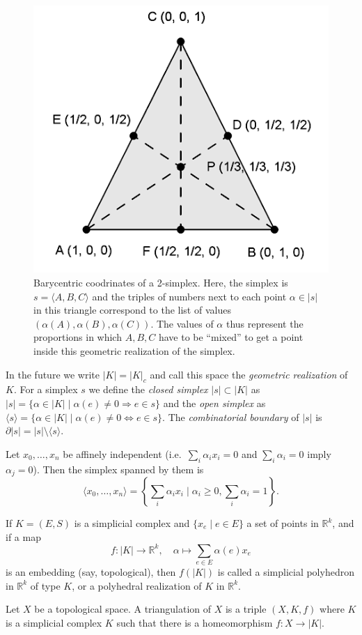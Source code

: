 \documentclass[english,letterpaper]{article}%
\numberwithin{equation}{section}
\numberwithin{figure}{section}
\numberwithin{table}{section}
\theoremstyle{definition}
\theoremstyle{definition}
\theoremstyle{definition}
\theoremstyle{plain}
\theoremstyle{plain}
\theoremstyle{plain}
\theoremstyle{plain}
\theoremstyle{remark}
\theoremstyle{remark}
\newcommand{\bbR}{\mathbb{R}}
\renewcommand{\geq}{\geqslant}
\begin{document}
\begin{figure}[h]
    \centering
    \includegraphics[scale=0.3]{Images/barycentric.png}
    \caption{Barycentric coodrinates of a 2-simplex. Here, the simplex is $s=\langle A,B,C\rangle$ and the triples of numbers next to each point $\alpha\in |s|$ in this triangle correspond to the list of values $(\alpha(A),\alpha(B),\alpha(C))$. The values of $\alpha$ thus represent the proportions in which $A,B,C$ have to be ``mixed'' to get a point inside this geometric realization of the simplex.\label{fig. simplex}}
\end{figure}


In the future we write $|K|=|K|_c$ and call this space the \emph{geometric realization} of $K$. For a simplex $s$ we define the \emph{closed simplex} $|s|\subset |K|$ as $|s|=\{\alpha\in|K|\mid \alpha(e)\neq 0\Rightarrow e\in s\}$ and the \emph{open simplex} as $\langle s\rangle=\{\alpha\in |K|\mid \alpha(e)\neq 0\Leftrightarrow e\in s\}$. The \emph{combinatorial boundary} of $|s|$ is $\partial|s|=|s|\setminus\langle s\rangle$.

\begin{defn}[Standard simplices in $\bbR^k$]
    Let $x_0,\ldots,x_n$ be affinely independent (i.e.\ $\sum_i\alpha_i x_i=0$ and $\sum_i\alpha_i=0$ imply $\alpha_j=0$). Then the simplex spanned by them is \[\langle x_0,\ldots,x_n\rangle=\left\{\sum_i \alpha_i x_i\mid \alpha_i\geq 0,\sum_i \alpha_i=1\right\}.\]
\end{defn}
\begin{defn}
    If $K=(E,S)$ is a simplicial complex and $\{x_e\mid e\in E\}$ a set of points in $\bbR^k$, and if a map
    \[f:|K|\to \bbR^k,\quad \alpha\mapsto \sum_{e\in E}\alpha(e)x_e\]
    is an embedding (say, topological), then $f(|K|)$ is called a simplicial polyhedron in $\bbR^k$ of type $K$, or a polyhedral realization of $K$ in $\bbR^k$.
\end{defn}
\begin{defn}[Triangulation]
    Let $X$ be a topological space. A triangulation of $X$ is a triple $(X,K,f)$ where $K$ is a simplicial complex $K$ such that there is a homeomorphism $f:X\to |K|$.
\end{defn}
\end{document}
